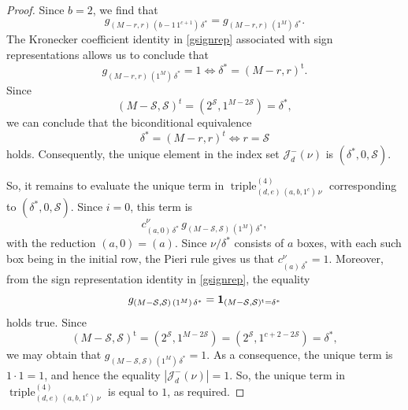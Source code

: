 \documentclass[10pt,a4paper]{amsart}
\begin{document}
\begin{proof}
 Since $b =2$, we find that $$ g_{(M-r,r) \, (b-1 \, 1^{c+1}) \, \delta^{\ast} } = g_{(M-r, r) \, (1^{M}) \, \delta^{\ast}}. $$ The Kronecker 
 coefficient identity in \eqref{gsignrep} associated with sign representations allows us to conclude that $$ g_{(M-r,r) \, (1^M) \, 
 \delta^{\ast} } = 1 \Longleftrightarrow \delta^{\ast} = (M-r,r)^{\operatorname{t}}. $$ Since $$ (M-\mathcal{S}, 
 \mathcal{S})^t=(2^{\mathcal{S}},1^{M-2\mathcal{S}})=\delta^\ast, $$ we can conclude that the biconditional equivalence 
 $$ \delta^\ast=(M-r,r)^t \Longleftrightarrow r=\mathcal S $$ holds. Consequently, the unique element in 
 the index set $\mathcal{J}_{d}^{-}(\nu)$ is $(\delta^{\ast}, 0, \mathcal{S})$. 

 So, it remains to evaluate the unique term in $\operatorname{triple}^{(4)}_{(d,e)\,(a,b,1^c)\,\nu}$ corresponding to $(\delta^\ast, 0, 
 \mathcal S)$. Since $i=0$, this term is $$ c_{(a,0) \, \delta^\ast}^{\nu} \, g_{(M-\mathcal S,\mathcal S)\,(1^M)\,\delta^\ast}, $$ with 
 the reduction $(a,0)=(a)$. Since $\nu/\delta^\ast$ consists of $a$ boxes, with each such box being in the initial row, the Pieri rule gives 
 us that $ c_{(a)\,\delta^\ast}^{\nu}=1$. Moreover, from the sign representation identity in \eqref{gsignrep}, the equality 
 $$ g_{ (M - \mathcal{S}, \mathcal{S}) \, (1^{M}) \, \delta^{\ast} } = \text{{\bf 1}}_{ (M - \mathcal{S}, \mathcal{S} )^{\operatorname{t}} 
 = \delta^{\ast}} $$ holds true. Since $$ (M - \mathcal{S}, \mathcal{S})^{\operatorname{t}} = (2^{\mathcal{S}}, 1^{M - 2 \mathcal{S}}) = 
 (2^{\mathcal{S}}, 1^{c + 2 - 2\mathcal{S}}) = \delta^\ast, $$ we may obtain that $ g_{(M - \mathcal{S}, \mathcal{S}) \, (1^M) \, 
 \delta^\ast}=1$. As a consequence, the unique term is $1\cdot 1=1$, and hence the equality 
 $ |\mathcal J_d^{-}(\nu)|=1$. So, the unique term in $\operatorname{triple}^{(4)}_{(d,e)\,(a,b,1^c)\,\nu}$
 is equal to $1$, as required. 
\end{proof}
\end{document}
